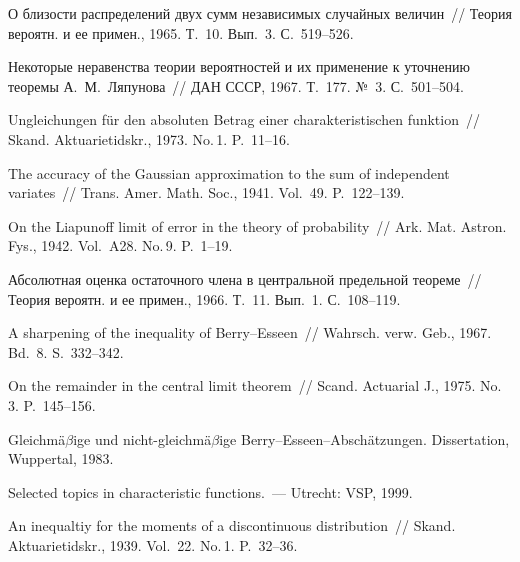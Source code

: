 \begin{multicols}{2}
{{\begin{thebibliography}{99}
О близости распределений двух сумм независимых
случайных величин~// Теория вероятн. и ее примен., 1965. Т.~10.
Вып.~3. С.~519--526.


Некоторые неравенства теории вероятностей и их
применение к уточнению теоремы А.~М.~Ляпунова~// ДАН СССР, 1967.
Т.~177. №~3. С.~501--504.

Ungleichungen f\"{u}r den absoluten Betrag einer
charakteristischen funktion~// Skand. Aktuarietidskr., 1973. No.\,1. P.~11--16.

The accuracy of the Gaussian approximation to the
sum of independent variates~// Trans. Amer. Math. Soc., 1941.
Vol.~49. P.~122--139.

On the Liapunoff limit of error in the theory of
probability~// Ark. Mat. Astron. Fys., 1942. Vol.~A28. No.\,9.
P.~1--19.

Абсолютная оценка остаточного члена в
центральной предельной теореме~// Теория вероятн. и ее примен.,
1966. Т.~11. Вып.~1. С.~108--119.

A sharpening of the inequality of Berry--Esseen~// Wahrsch. verw. Geb., 1967. Bd.~8. S.~332--342.

On the remainder in the central limit theorem~//
Scand. Actuarial J., 1975. No.\,3. P.~145--156.

Gleichm{\"a}$\beta$ige und
nicht-gleichm{\"a}$\beta$ige Berry--Esseen--Absch{\"a}tzungen.
Dissertation, Wuppertal, 1983.

\label{end\stat}

Selected topics in characteristic functions.~--- Utrecht: VSP, 1999.

An inequaltiy for the moments of a discontinuous
distribution~// Skand. Aktuarietidskr., 1939. Vol.~22. No.\,1. P.~32--36.


 \end{thebibliography}
}
}
\end{multicols}